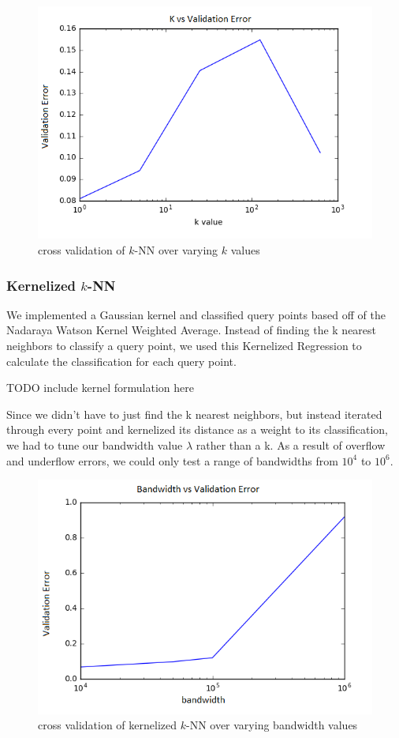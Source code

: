 \documentclass{article} %
\begin{document}
\begin{figure}[h]
\includegraphics[width=\textwidth]{knn-c-cv.png}
\caption{cross validation of $k$-NN over varying $k$ values}
\label{fig:knn-c-cv}
\end{figure}

\subsubsection{Kernelized $k$-NN}
We implemented a Gaussian kernel and classified query points
based off of the Nadaraya Watson Kernel Weighted Average. Instead of finding
the k nearest neighbors to classify a query point, we used this Kernelized
Regression to calculate the classification for each query point.

TODO include kernel formulation here

Since we didn’t have to just find the k nearest neighbors, but instead
iterated through every point and kernelized its distance as a weight to
its classification, we had to tune our bandwidth value $\lambda$ rather than a k.
As a result of overflow and underflow errors, we could only test a range
of bandwidths from $10^4$ to $10^6$. 


\begin{figure}[h]
\includegraphics[width=\textwidth]{knn-kernel-bandwidth-cv.png}
\caption{cross validation of kernelized $k$-NN over varying bandwidth values}
\label{fig:knn-kernel-bandwidth-cv}
\end{figure}
\end{document}
